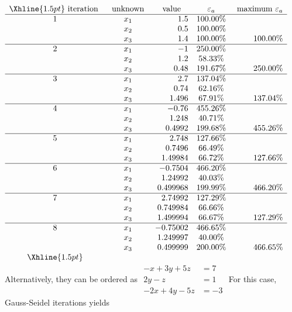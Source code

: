 \documentclass[../main.tex]{subfiles}
\begin{document}
\begin{enumerate}[label=\bfseries(\alph*)]
$\begin{array}{ccrcr}
\Xhline{1.5pt} \text { iteration } & \text { unknown } & \multicolumn{1}{c}{\text { value }} & \varepsilon_{a} & \text { maximum } \varepsilon_{a} \\
\hline 1 & x_{1} & 1.5 & 100.00 \% & \\
& x_{2} & 0.5 & 100.00 \% & \\
& x_{3} & 1.4 & 100.00 \% & 100.00 \% \\
\hline 2 & x_{1} & -1 & 250.00 \% & \\
& x_{2} & 1.2 & 58.33 \% & \\
& x_{3} & 0.48 & 191.67 \% & 250.00 \% \\
\hline 3 & x_{1} & 2.7 & 137.04 \% & \\
& x_{2} & 0.74 & 62.16 \% & \\
& x_{3} & 1.496 & 67.91 \% & 137.04 \% \\
\hline 4 & x_{1} & -0.76 & 455.26 \% & \\
& x_{2} & 1.248 & 40.71 \% & \\
& x_{3} & 0.4992 & 199.68 \% & 455.26 \% \\
\hline 5 & x_{1} & 2.748 & 127.66 \% & \\
& x_{2} & 0.7496 & 66.49 \% & \\
& x_{3} & 1.49984 & 66.72 \% & 127.66 \% \\
\hline 6 & x_{1} & -0.7504 & 466.20 \% & \\
& x_{2} & 1.24992 & 40.03 \% & \\
& x_{3} & 0.499968 & 199.99 \% & 466.20 \% \\
\hline 7 & x_{1} & 2.74992 & 127.29 \% & \\
& x_{2} & 0.749984 & 66.66 \% & \\
& x_{3} & 1.499994 & 66.67 \% & 127.29 \% \\
\hline 8 & x_{1} & -0.75002 & 466.65 \% & \\
& x_{2} & 1.249997 & 40.00 \% & \\
& x_{3} & 0.499999 & 200.00 \% & 466.65 \% \\
\Xhline{1.5pt}
\end{array}$
\bigbreak
Alternatively, they can be ordered as
\bigbreak$
\begin{aligned}
-x+3 y+5 z &=7 \\
2 y-z &=1 \\
-2 x+4 y-5 z &=-3
\end{aligned}$
\bigbreak
For this case, Gauss-Seidel iterations yields
\bigbreak


\end{enumerate}
\end{document}
